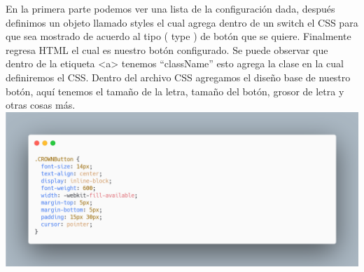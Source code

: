 \newline
\newline
En la primera parte podemos ver una lista de la configuración dada,  después definimos un objeto llamado styles el cual agrega dentro de un switch el CSS para que sea mostrado de acuerdo al tipo ( type ) de botón que se quiere. Finalmente regresa HTML el cual es nuestro botón configurado.
Se puede observar que dentro de la etiqueta <a> tenemos “className” esto agrega la clase en la cual definiremos el CSS.
Dentro del archivo CSS agregamos el diseño base de nuestro botón, aquí tenemos el  tamaño de la letra, tamaño del botón, grosor de letra y otras cosas más.
\newline
\newline
\includegraphics[width=1\textwidth]{./Imagenes/image26.png}
\newline
\newline



